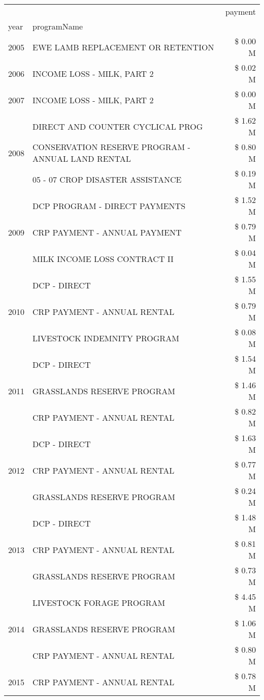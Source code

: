 \begin{tabular}{llr}
\toprule
 &  & payment \\
year & programName &  \\
\midrule
2005 & EWE LAMB REPLACEMENT OR RETENTION & \$ 0.00 M \\
\cline{1-3}
2006 & INCOME LOSS - MILK, PART 2 & \$ 0.02 M \\
\cline{1-3}
2007 & INCOME LOSS - MILK, PART 2 & \$ 0.00 M \\
\cline{1-3}
\multirow[t]{3}{*}{2008} & DIRECT AND COUNTER CYCLICAL PROG & \$ 1.62 M \\
 & CONSERVATION RESERVE PROGRAM - ANNUAL LAND RENTAL & \$ 0.80 M \\
 & 05 - 07 CROP DISASTER ASSISTANCE & \$ 0.19 M \\
\cline{1-3}
\multirow[t]{3}{*}{2009} & DCP PROGRAM - DIRECT PAYMENTS & \$ 1.52 M \\
 & CRP PAYMENT - ANNUAL PAYMENT & \$ 0.79 M \\
 & MILK INCOME LOSS CONTRACT II & \$ 0.04 M \\
\cline{1-3}
\multirow[t]{3}{*}{2010} & DCP - DIRECT & \$ 1.55 M \\
 & CRP PAYMENT - ANNUAL RENTAL & \$ 0.79 M \\
 & LIVESTOCK INDEMNITY PROGRAM & \$ 0.08 M \\
\cline{1-3}
\multirow[t]{3}{*}{2011} & DCP - DIRECT & \$ 1.54 M \\
 & GRASSLANDS RESERVE PROGRAM & \$ 1.46 M \\
 & CRP PAYMENT - ANNUAL RENTAL & \$ 0.82 M \\
\cline{1-3}
\multirow[t]{3}{*}{2012} & DCP - DIRECT & \$ 1.63 M \\
 & CRP PAYMENT - ANNUAL RENTAL & \$ 0.77 M \\
 & GRASSLANDS RESERVE PROGRAM & \$ 0.24 M \\
\cline{1-3}
\multirow[t]{3}{*}{2013} & DCP - DIRECT & \$ 1.48 M \\
 & CRP PAYMENT - ANNUAL RENTAL & \$ 0.81 M \\
 & GRASSLANDS RESERVE PROGRAM & \$ 0.73 M \\
\cline{1-3}
\multirow[t]{3}{*}{2014} & LIVESTOCK FORAGE PROGRAM & \$ 4.45 M \\
 & GRASSLANDS RESERVE PROGRAM & \$ 1.06 M \\
 & CRP PAYMENT - ANNUAL RENTAL & \$ 0.80 M \\
\cline{1-3}
\multirow[t]{3}{*}{2015} & CRP PAYMENT - ANNUAL RENTAL & \$ 0.78 M \\

\end{tabular}
